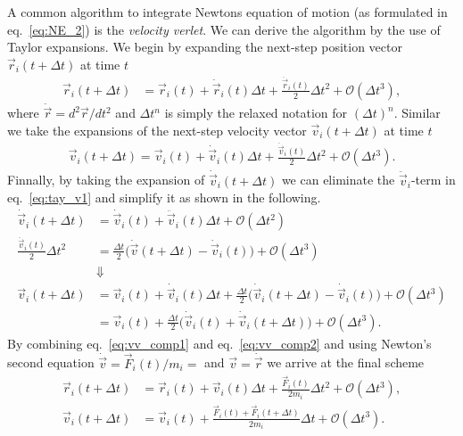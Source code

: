 A common algorithm to integrate Newtons equation of motion (as formulated in
eq.~\eqref{eq:NE_2}) is the \textit{velocity verlet}. We can derive the algorithm
by the use of Taylor expansions. We begin by expanding the next-step position
vector $\vec{r}_i(t + \Delta t)$ at time $t$
\begin{align}
  \vec{r}_i(t + \Delta t) &= \vec{r}_i(t) + \dot{\vec{r}}_i(t) \Delta t + \frac{\ddot{\vec{r}}_i(t)}{2} \Delta t^2 + \mathcal{O}(\Delta t^3) \label{eq:vv_comp1},
\end{align}
where $\ddot{\vec{r}} = d^2\vec{r}/dt^2$ and $\Delta t^n$ is simply the relaxed
notation for $(\Delta t)^n$. Similar we take the expansions of the next-step
velocity vector $\vec{v}_i(t+\Delta t)$ at time $t$ 
\begin{align}
  \vec{v}_i(t+\Delta t) = \vec{v}_i(t) + \dot{\vec{v}}_i(t) \Delta t + \frac{\ddot{\vec{v}}_i(t)}{2}\Delta t^2 + \mathcal{O}(\Delta t^3).
  \label{eq:tay_v1}
\end{align}
Finnally, by taking the expansion of $\dot{\vec{v}}_i(t+\Delta t)$ we can
eliminate the $\ddot{\vec{v}}_i$-term in eq.~\eqref{eq:tay_v1} and simplify it
as shown in the following.
\begin{align}
  \dot{\vec{v}}_i(t+\Delta t) &= \dot{\vec{v}}_i(t) + \ddot{\vec{v}}_i(t) \Delta t + \mathcal{O}(\Delta t^2) \nonumber \\
  \frac{\ddot{\vec{v}}_i(t)}{2}\Delta t^2 &= \frac{\Delta t}{2}\Big( \dot{\vec{v}}(t+\Delta t) - \dot{\vec{v}}_i(t)\Big) + \mathcal{O}(\Delta t^3) \nonumber \\
  &\Downarrow \nonumber \\
  \vec{v}_i(t+\Delta t) &= \vec{v}_i(t) + \dot{\vec{v}}_i(t) \Delta t + \frac{\Delta t}{2}\Big( \dot{\vec{v}}_i(t+\Delta t) - \dot{\vec{v}}_i(t)\Big) + \mathcal{O}(\Delta t^3) \nonumber \\
  &=  \vec{v}_i(t) + \frac{\Delta t}{2}\Big( \dot{\vec{v}}_i(t) +  \dot{\vec{v}}_i(t+\Delta t)\Big) + \mathcal{O}(\Delta t^3).
  \label{eq:vv_comp2}
\end{align}
By combining eq.~\eqref{eq:vv_comp1} and eq.~\eqref{eq:vv_comp2} and using
Newton's second equation $\dot{\vec{v}} = \vec{F}_i(t)/m_i = $ and $\vec{v} =
\dot{\vec{r}}$ we arrive at the final scheme
\begin{align*}
  \vec{r}_i(t + \Delta t) &= \vec{r}_i(t) + \vec{v}_i(t) \Delta t + \frac{\vec{F}_i(t)}{2m_i}\Delta t^2 + \mathcal{O}(\Delta t^3), \\
  \vec{v}_i(t+\Delta t)  &= \vec{v}_i(t) + \frac{\vec{F}_i(t) + \vec{F}_i(t+\Delta t)}{2m_i}  \Delta t + \mathcal{O}(\Delta t^3).
\end{align*}
